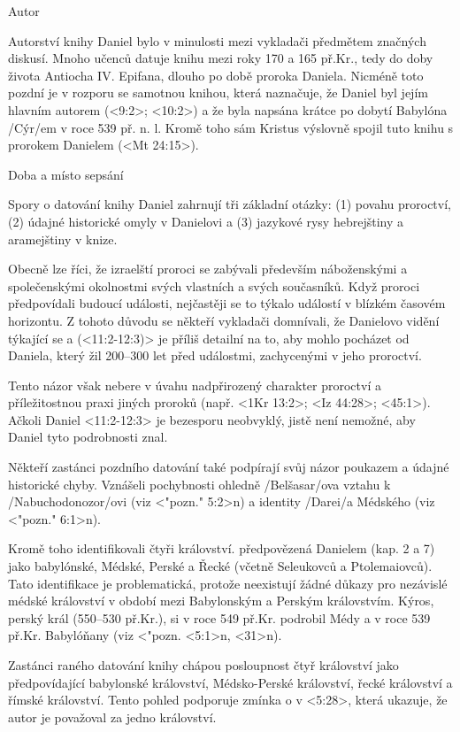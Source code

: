 Autor

Autorství knihy Daniel bylo v minulosti mezi vykladači předmětem značných diskusí. Mnoho
učenců datuje knihu mezi roky 170 a 165 př.Kr., tedy do doby života Antiocha IV. Epifana, dlouho
po době proroka Daniela. Nicméně toto pozdní je v rozporu se samotnou knihou, která naznačuje, že
Daniel byl jejím hlavním autorem (<9:2>; <10:2>) a že  byla napsána krátce po dobytí Babylóna 
\x/Cýr/em v roce 539 př. n. l. Kromě toho sám Kristus výslovně spojil tuto knihu s prorokem Danielem (<Mt 24:15>).

Doba a místo sepsání

Spory o datování knihy Daniel zahrnují tři základní otázky: (1) povahu proroctví,
(2) údajné historické omyly v Danielovi a (3) jazykové rysy hebrejštiny a aramejštiny v knize.

Obecně lze říci, že izraelští proroci se zabývali především náboženskými a společenskými okolnostmi
svých vlastních a svých současníků. Když proroci předpovídali budoucí události, nejčastěji se to týkalo událostí v blízkém časovém horizontu.
Z tohoto důvodu se někteří vykladači domnívali, že Danielovo vidění týkající se  a  (<11:2-12:3)> je příliš detailní na to,
aby mohlo pocházet  od Daniela, který žil 200--300 let před událostmi, zachycenými v  jeho proroctví.

Tento názor však nebere v úvahu nadpřirozený charakter proroctví a příležitostnou
praxi jiných proroků (např. <1Kr 13:2>; <Iz 44:28>; <45:1>).
Ačkoli Daniel <11:2-12:3> je bezesporu neobvyklý,  jistě není nemožné, aby Daniel tyto podrobnosti znal.

Někteří zastánci pozdního datování také podpírají svůj názor poukazem a údajné 
historické chyby. Vznášeli pochybnosti ohledně \x/Belšasar/ova
vztahu k \x/Nabuchodonozor/ovi (viz <"pozn." 5:2>n) a
identity \x/Darei/a Médského (viz <"pozn."  6:1>n).

Kromě toho identifikovali čtyři království.
předpovězená Danielem (kap. 2 a 7) jako babylónské,
Médské, Perské a Řecké (včetně Seleukovců a Ptolemaiovců).
Tato identifikace je problematická, protože neexistují žádné důkazy pro
nezávislé médské království v období mezi Babylonským a Perským královstvím.
Kýros, perský král (550--530 př.Kr.), si v roce 549 př.Kr. podrobil Médy a v roce 539 př.Kr. 
Babylóňany (viz <"pozn.  <5:1>n, <31>n).

Zastánci raného datování knihy chápou posloupnost čtyř království jako
předpovídající babylonské království, Médsko-Perské království, řecké království a římské království.
Tento pohled podporuje  zmínka o  v <5:28>, která ukazuje, že autor je považoval za jedno království.

